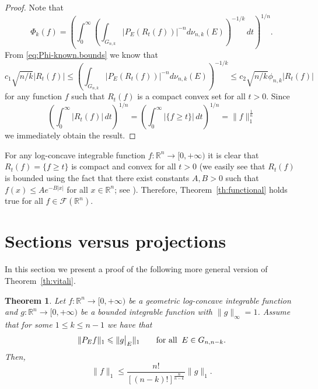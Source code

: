 \documentclass[11pt,leqno]{article}
\newtheorem{theorem}{Theorem}[section]
\theoremstyle{definition}
\theoremstyle{remark}
\numberwithin{equation}{section}
\newcommand{\ls}{\leqslant}
\newcommand{\gr}{\geqslant}
\newcommand{\1}{\textbf{1}}
\begin{document}
\begin{proof}Note that
$$\Phi_k(f)=\left(\int_0^{\infty}\left(\int_{G_{n,k}}|P_E(R_t(f))|^{-n}d\nu_{n,k}(E)\right)^{-1/k}\,dt\right)^{1/n}.$$
From \eqref{eq:Phi-known.bounds} we know that
$$c_1 \sqrt{n/k}|R_t(f)|\ls \left(\int_{G_{n,k}}|P_E(R_t(f))|^{-n}d\nu_{n,k}(E)\right)^{-1/k}
\ls c_2\sqrt{n/k}\phi_{n,k}|R_t(f)|$$
for any function $f$ such that $R_t(f)$ is a compact convex set for all $t>0$. Since
$$\left(\int_0^{\infty}|R_t(f)|\,dt\right)^{1/n}=\left(\int_0^{\infty}|\{f\gr t\}|\,dt\right)^{1/n}=\|f\|_1^{\frac{1}{n}}$$
we immediately obtain the result.\end{proof}

 For any log-concave integrable function $f:{\mathbb R}^n\to [0,+\infty)$ it is clear that $R_t(f)=\{f\gr t\}$ is
compact and convex for all $t>0$ (we easily see that $R_t(f)$ is bounded using the fact that there exist constants $A,B>0$ such that $f(x)\ls Ae^{-B|x|}$ for all $x\in {\mathbb R}^n$; see \cite[Lemma~2.2.1]{BGVV-book}). Therefore, Theorem~\ref{th:functional} holds true for all $f\in {\mathcal F}({\mathbb R}^n)$.



\section{Sections versus projections}\label{section-4}

In this section we present a proof of the following more general version of Theorem~\ref{th:vitali}.

\begin{theorem}\label{th:mixed}Let $f:{\mathbb R}^n\to [0,+\infty)$ be a geometric log-concave integrable function
and $g:{\mathbb R}^n\to [0,+\infty)$ be a bounded integrable function with $\|g\|_{\infty}=1$.
Assume that for some $1\ls k\ls n-1$ we have that
$$\|P_Ef\|_1\ls \|g\big|_E\|_1\qquad\hbox{for all}\;\;E\in G_{n,n-k}.$$
Then,
$$\|f\|_1\ls \frac{n!}{[(n-k)!]^{\frac{n}{n-k}}}\|g\|_1.$$
\end{theorem}
\end{document}
